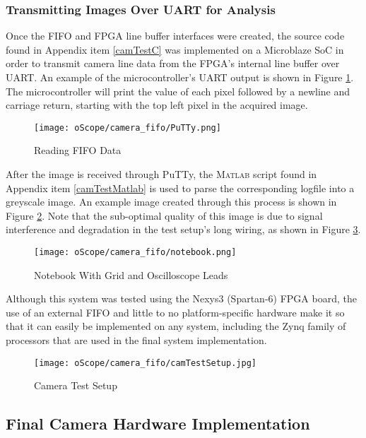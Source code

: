 \subsubsection{Transmitting Images Over UART for Analysis} \label{UARTimg}
Once the FIFO and FPGA line buffer interfaces were created, the source code found in Appendix item \ref{camTestC} was implemented on a Microblaze SoC in order to transmit camera line data from the FPGA's internal line buffer over UART. An example of the microcontroller's UART output is shown in Figure \ref{PuTTYfifoData}. The microcontroller will print the value of each pixel followed by a newline and carriage return, starting with the top left pixel in the acquired image. 
\begin{figure}[H]
	\centerline{\texttt{[image: oScope/camera\_fifo/PuTTy.png]}}
	\caption{Reading FIFO Data}
	\label{PuTTYfifoData}
\end{figure}
\par
After the image is received through PuTTy, the \textsc{Matlab} script found in Appendix item \ref{camTestMatlab} is used to parse the corresponding logfile into a greyscale image. An example image created through this process is shown in Figure \ref{notebookImage}. Note that the sub-optimal quality of this image is due to signal interference and degradation in the test setup's long wiring, as shown in Figure \ref{camTestSetup}. 
\begin{figure}[H]
	\centerline{\texttt{[image: oScope/camera\_fifo/notebook.png]}}
	\caption{Notebook With Grid and Oscilloscope Leads}
	\label{notebookImage}
\end{figure}
\par
Although this system was tested using the Nexys3 (Spartan-6) FPGA board, the use of an external FIFO and little to no platform-specific hardware make it so that it can easily be implemented on any system, including the Zynq family of processors that are used in the final system implementation.   
\begin{figure}[H]
	\centerline{\texttt{[image: oScope/camera\_fifo/camTestSetup.jpg]}}
	\caption{Camera Test Setup}
	\label{camTestSetup}
\end{figure}

\subsection{Final Camera Hardware Implementation}
